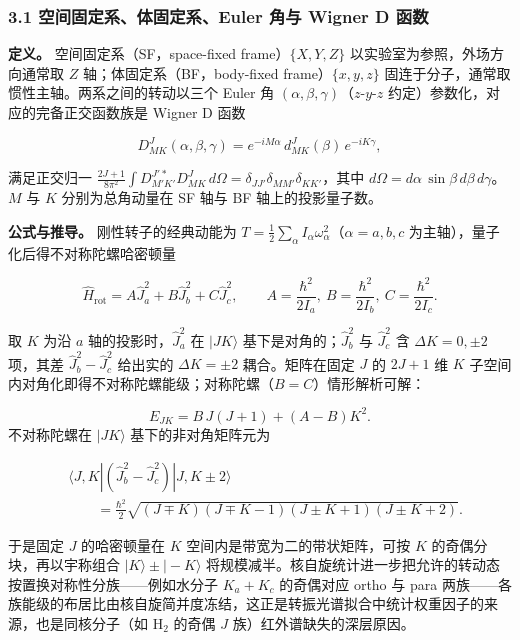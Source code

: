 \documentclass[
]{ctexbook}
\begin{document}
\hypertarget{ux7a7aux95f4ux56faux5b9aux7cfbux4f53ux56faux5b9aux7cfbeuler-ux89d2ux4e0e-wigner-d-ux51fdux6570}{%
\subsubsection{3.1 空间固定系、体固定系、Euler 角与 Wigner D
函数}\label{ux7a7aux95f4ux56faux5b9aux7cfbux4f53ux56faux5b9aux7cfbeuler-ux89d2ux4e0e-wigner-d-ux51fdux6570}}

\textbf{定义。} 空间固定系（SF，space-fixed frame）\(\{X,Y,Z\}\)
以实验室为参照，外场方向通常取 \(Z\) 轴；体固定系（BF，body-fixed
frame）\(\{x,y,z\}\) 固连于分子，通常取惯性主轴。两系之间的转动以三个
Euler 角 \((\alpha,\beta,\gamma)\)（\(z\)-\(y\)-\(z\)
约定）参数化，对应的完备正交函数族是 Wigner D 函数

\[D^{J}_{MK}(\alpha,\beta,\gamma)=e^{-iM\alpha}\,d^{J}_{MK}(\beta)\,e^{-iK\gamma},\]

满足正交归一
\(\frac{2J+1}{8\pi^{2}}\int D^{J'*}_{M'K'}D^{J}_{MK}\,d\Omega=\delta_{JJ'}\delta_{MM'}\delta_{KK'}\)，其中
\(d\Omega=d\alpha\,\sin\beta\,d\beta\,d\gamma\)。\(M\) 与 \(K\)
分别为总角动量在 SF 轴与 BF 轴上的投影量子数。

\textbf{公式与推导。} 刚性转子的经典动能为
\(T=\frac12\sum_{\alpha}I_{\alpha}\omega_{\alpha}^{2}\)（\(\alpha=a,b,c\)
为主轴），量子化后得不对称陀螺哈密顿量

\[\hat{H}_{\mathrm{rot}}=A\hat{J}_a^{2}+B\hat{J}_b^{2}+C\hat{J}_c^{2},\qquad A=\frac{\hbar^{2}}{2I_a},\ B=\frac{\hbar^{2}}{2I_b},\ C=\frac{\hbar^{2}}{2I_c}.\]

取 \(K\) 为沿 \(a\) 轴的投影时，\(\hat J_a^2\) 在 \(|JK\rangle\)
基下是对角的；\(\hat J_b^2\) 与 \(\hat J_c^2\) 含 \(\Delta K=0,\pm2\)
项，其差 \(\hat J_b^2-\hat J_c^2\) 给出实的 \(\Delta K=\pm2\)
耦合。矩阵在固定 \(J\) 的 \(2J+1\) 维 \(K\)
子空间内对角化即得不对称陀螺能级；对称陀螺（\(B=C\)）情形解析可解：

\[E_{JK}=B\,J(J+1)+(A-B)K^{2}.\] 不对称陀螺在 \(|JK\rangle\)
基下的非对角矩阵元为

\[
\begin{aligned}
&\langle J,K|(\hat{J}_b^{2}-\hat{J}_c^{2})|J,K\pm2\rangle\\
&\qquad=\frac{\hbar^{2}}{2}\sqrt{(J\mp K)(J\mp K-1)(J\pm K+1)(J\pm K+2)}.
\end{aligned}
\]

于是固定 \(J\) 的哈密顿量在 \(K\) 空间内是带宽为二的带状矩阵，可按 \(K\)
的奇偶分块，再以宇称组合 \(|K\rangle\pm|-K\rangle\)
将规模减半。核自旋统计进一步把允许的转动态按置换对称性分族------例如水分子
\(K_a+K_c\) 的奇偶对应 ortho 与 para
两族------各族能级的布居比由核自旋简并度冻结，这正是转振光谱拟合中统计权重因子的来源，也是同核分子（如
\(\mathrm{H}_2\) 的奇偶 \(J\) 族）红外谱缺失的深层原因。
\end{document}
